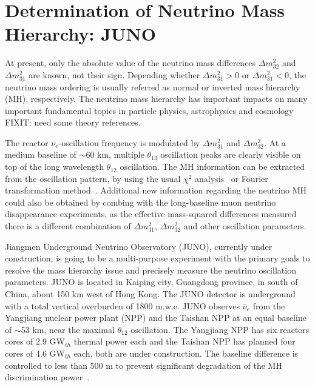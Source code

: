 \newcommand{\fixit}[1]{{\color{red}FIXIT: #1}}
\section{Determination of Neutrino Mass Hierarchy: JUNO}

At present, only the absolute value of the neutrino mass differences $\Delta m^2_{32}$ and $\Delta m^2_{31}$ are known, not their sign. Depending whether $\Delta m^2_{31}>0$ or $\Delta m^2_{31}<0$, the neutrino mass ordering is usually referred as normal or inverted mass hierarchy (MH), respectively. The neutrino mass hierarchy has important impacts on many important fundamental topics in particle physics, astrophysics and cosmology \fixit{need some theory references}.

The reactor $\bar\nu_e$-oscillation frequency is modulated by $\Delta m^2_{31}$ and $\Delta m^2_{32}$. At a medium baseline of $\sim$60 km, multiple $\theta_{13}$ oscillation peaks are clearly visible on top of the long wavelength $\theta_{12}$ oscillation.
The MH information can be extracted from the oscillation pattern, by using the usual $\chi^2$ analysis~\cite{Li-PRD13} or Fourier transformation method~\cite{Zhan-PRD08,Zhan-PRD09}. Additional new information regarding the neutrino MH could also be obtained by combing with the long-baseline muon neutrino disappearance experiments, as the effective mass-squared differences measured there is a different combination of $\Delta m^2_{31}$, $\Delta m^2_{32}$ and other oscillation parameters.
%

Jiangmen Underground Neutrino Observatory (JUNO), currently under construction, is going to be a multi-purpose experiment with the primary goals to resolve the mass hierarchy issue and precisely measure the neutrino oscillation parameters.
JUNO is located in Kaiping city, Guangdong province, in south of China, about 150 km west of Hong Kong. The JUNO detector is underground with a total vertical overburden of 1800 m.w.e. JUNO observes $\bar\nu_e$ from the Yangjiang nuclear power plant (NPP) and the Taishan NPP at an equal baseline of $\sim$53 km, near the maximal $\theta_{12}$ oscillation. The Yangjiang NPP has six reactors cores of 2.9 GW$_{th}$ thermal power each and the Taishan NPP has planned four cores of 4.6 GW$_{th}$ each, both are under construction. The baseline difference is controlled to less than 500 m to prevent significant degradation of the MH discrimination power~\cite{Li-PRD13}.

